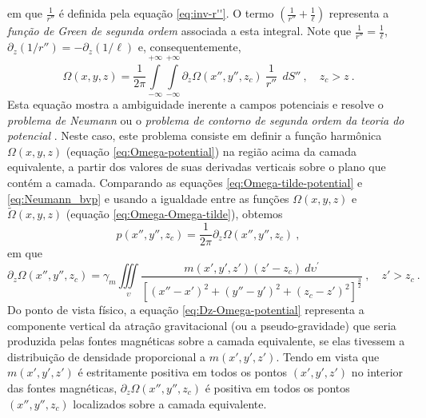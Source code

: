 em que $\frac{1}{r''}$ é definida pela equação \ref{eq:inv-r''}. O termo $\left( \frac{1}{r''} + \frac{1}{\ell} \right)$ 
representa a \textit{função de Green de segunda ordem} \citep[][ p. 246]{kellogg1967} associada a esta integral. 
Note que $\frac{1}{r''} = \frac{1}{\ell}$, $\partial_{z} (1/r'') = -\partial_{z} (1/\ell)$ e, consequentemente, 
\begin{equation}
\Omega(x, y, z) = \frac{1}{2\pi}
\int\limits_{-\infty}^{+\infty}\int\limits_{-\infty}^{+\infty}
\partial_{z} \Omega(x'', y'', z_{c}) \: \frac{1}{r''} 
\:\: dS'' \: , \quad z_{c} > z \: .
\label{eq:Neumann_bvp}
\end{equation}
Esta equação mostra a ambiguidade inerente a campos potenciais \citep{roy1962} e resolve 
o \textit{problema de Neumann} ou o \textit{problema de contorno de segunda ordem da teoria do potencial} 
\citep[][ p. 246]{kellogg1967}. Neste caso, este problema consiste em definir a função harmônica 
$\Omega(x, y, z)$ (equação \ref{eq:Omega-potential}) na região acima da camada equivalente, 
a partir dos valores de suas derivadas verticais sobre o plano que contém a camada. 
Comparando as equações \ref{eq:Omega-tilde-potential} e \ref{eq:Neumann_bvp} e usando a igualdade 
entre as funções $\Omega(x, y, z)$ e $\tilde{\Omega}(x, y, z)$ (equação \ref{eq:Omega-Omega-tilde}), 
obtemos 
\begin{equation}
p(x'', y'', z_{c}) = \frac{1}{2\pi} \partial_{z} \Omega(x'', y'', z_{c}) \: ,
\label{eq:positivity_prop}
\end{equation}
em que
\begin{equation}
\partial_{z} \Omega(x'', y'', z_{c}) = \gamma_{m} \iiint\limits_{\upsilon} 
\frac{m(x', y', z') (z' - z_{c}) \: 
d\upsilon^{\prime}}
{\left[ (x''-x')^2 + (y''-y')^2 + (z_{c}-z')^2 \right]^{\frac{3}{2}}} \: , \quad z' > z_{c} \: .
\label{eq:Dz-Omega-potential}
\end{equation}
Do ponto de vista físico, a equação \ref{eq:Dz-Omega-potential} representa a componente vertical da atração 
gravitacional (ou a pseudo-gravidade) que seria produzida pelas fontes magnéticas sobre a camada equivalente, 
se elas tivessem a distribuição de densidade proporcional a $m(x', y', z')$. Tendo em vista que 
$m(x', y', z')$ é estritamente positiva em todos os pontos $(x', y', z')$ no interior das fontes magnéticas, 
$\partial_{z} \Omega(x'', y'', z_{c})$ é positiva em todos os pontos $(x'', y'', z_{c})$ localizados sobre 
a camada equivalente.


